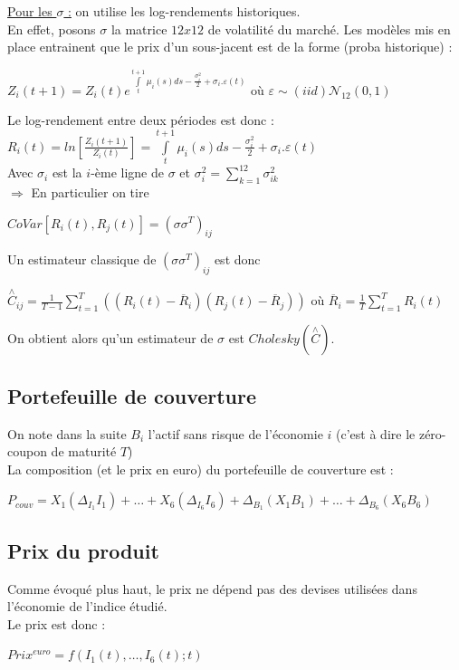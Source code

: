 \documentclass[a4paper,12pt]{article}
\begin{document}
\underline{Pour les $\sigma$ :} on utilise les log-rendements historiques. \\
En effet, posons $\sigma$ la matrice $12x12$ de volatilité du marché. Les modèles mis en place entrainent que le prix d'un sous-jacent est de la forme (proba historique) : 
\begin{center}
$Z_i(t+1)=Z_i(t)e^{\int\limits_t^{t+1}\mu_i(s)ds - \frac{\sigma_i^2}{2} + \sigma_i.\varepsilon(t)}$ où $\varepsilon\sim(iid)\mathcal{N}_{12}(0,1)$
\end{center}
Le log-rendement entre deux périodes est donc : $R_i(t)=ln\left[\frac{Z_i(t+1)}{Z_i(t)}\right] = \int\limits_t^{t+1}\mu_i(s)ds - \frac{\sigma_i^2}{2} + \sigma_i.\varepsilon(t)$ \\[2mm]
Avec $\sigma_i$ est la $i$-ème ligne de $\sigma$ et $\sigma_i^2=\sum\limits_{k=1}^{12}\sigma_{ik}^2$ \\[2mm]
$\Rightarrow$ En particulier on tire 
\begin{center}
$CoVar[R_i(t),R_j(t)] = (\sigma\sigma^T)_{ij}$
\end{center}
\newpage
Un estimateur classique de $(\sigma\sigma^T)_{ij}$ est donc
\begin{center}
 $\overset{\wedge}{C}_{ij}=\frac{1}{T-1}\sum\limits_{t=1}^T\left(\left(R_i(t)-\overline{R}_i\right)\left(R_j(t)-\overline{R}_j\right)\right)$ où $\overline{R}_i=\frac{1}{T}\sum\limits_{t=1}^TR_i(t)$
 \end{center}
 On obtient alors qu'un estimateur de $\sigma$ est $Cholesky(\overset{\wedge}{C})$.
\subsection{Portefeuille de couverture}
On note dans la suite $B_i$ l'actif sans risque de l'économie $i$ (c'est à dire le zéro-coupon de maturité $T$) \\[1mm]
La composition (et le prix en euro) du portefeuille de couverture est : 
\begin{center}
$P_{couv}=X_1(\Delta_{I_1}I_1)+\ldots+X_6(\Delta_{I_6}I_6)+\Delta_{B_1}(X_1B_1)+\ldots+\Delta_{B_6}(X_6B_6)$
\end{center}
\subsection{Prix du produit}
Comme évoqué plus haut, le prix ne dépend pas des devises utilisées dans l'économie de l'indice étudié. \\
Le prix est donc : 
\begin{center}
$Prix^{euro}=f(I_1(t),\ldots,I_6(t);t)$
\end{center}
\end{document}
